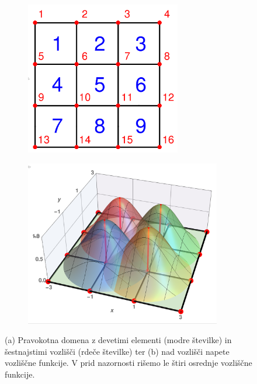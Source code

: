\begin{figure}[ht]
    \begin{subfigure}[b]{0.42\textwidth}
        \centering
        \includegraphics[height=67mm]{Slike/undeformedRegion.png}
        \vspace{6mm}
        \caption{}
    \end{subfigure}
    \begin{subfigure}[b]{0.55\textwidth}
        \centering
        \includegraphics[width=0.94\textwidth]{Slike/undeformedNodeFs.png}
        \caption{}
    \end{subfigure}
    \caption{(a) Pravokotna domena z devetimi elementi (modre številke) in šestnajstimi vozlišči (rdeče številke) ter (b) nad vozlišči napete vozliščne funkcije. V prid nazornosti rišemo le štiri osrednje vozliščne funkcije.}
    \label{fig:regionAndNodeFunctions}
\end{figure}

